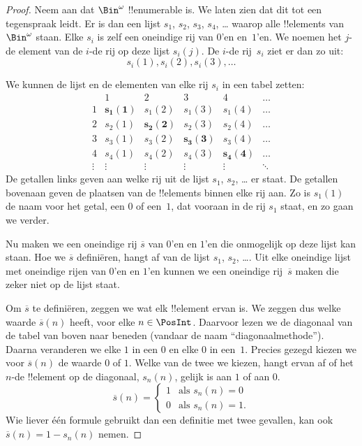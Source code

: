 \documentclass[openany]{memoir}
\begin{document}
\begin{proof}
Neem aan dat $\Bin^\omega$ !!{enumerable} is. We laten zien dat dit tot
een tegenspraak leidt. Er is dan een lijst $s_{1}$, $s_{2}$,
$s_{3}$, $s_{4}$, \dots{} waarop alle !!{element}s van~$\Bin^\omega$
staan. Elke $s_i$ is zelf een oneindige rij van $0$'en en~$1$'en. We
noemen het $j$-de element van de $i$-de rij op deze lijst $s_i(j)$. De
$i$-de rij~$s_i$ ziet er dan zo uit:
\[
s_i(1), s_i(2), s_i(3), \dots
\]

We kunnen de lijst en de elementen van elke rij $s_i$ in een tabel
zetten:
\[
\begin{array}{c|c|c|c|c|c}
& 1 & 2 & 3 & 4 & \dots \\\hline
1 & \mathbf{s_{1}(1)} & s_{1}(2) & s_{1}(3) & s_1(4) & \dots \\\hline
2 & s_{2}(1)& \mathbf{s_{2}(2)} & s_2(3) & s_2(4) & \dots \\\hline
3 & s_{3}(1)& s_{3}(2) & \mathbf{s_3(3)} & s_3(4) & \dots \\\hline
4 & s_{4}(1)& s_{4}(2) & s_4(3) & \mathbf{s_4(4)} & \dots \\\hline
\vdots & \vdots & \vdots & \vdots & \vdots & \mathbf{\ddots}
\end{array}
\]
De getallen links geven aan welke rij uit de lijst $s_1$, $s_2$,
\dots{} er staat. De getallen bovenaan geven de plaatsen van de
!!{element}s binnen elke rij aan. Zo is $s_{1}(1)$ de naam voor het
getal, een $0$ of een~$1$, dat vooraan in de rij $s_{1}$ staat, en zo
gaan we verder.

Nu maken we een oneindige rij $\overline{s}$ van $0$'en en $1$'en die
onmogelijk op deze lijst kan staan. Hoe we $\overline{s}$ definiëren,
hangt af van de lijst $s_1$, $s_2$, \dots. Uit elke oneindige lijst met
oneindige rijen van $0$'en en $1$'en kunnen we een oneindige
rij~$\overline{s}$ maken die zeker niet op de lijst staat.

Om $\overline{s}$ te definiëren, zeggen we wat elk !!{element} ervan
is. We zeggen dus welke waarde $\overline{s}(n)$ heeft, voor elke $n \in
\PosInt$. Daarvoor lezen
we de diagonaal van de tabel van boven naar beneden (vandaar de naam
``diagonaalmethode''). Daarna veranderen we elke $1$ in een $0$ en elke
$0$ in een~$1$. Precies gezegd kiezen we voor $\overline{s}(n)$ de
waarde $0$ of $1$. Welke van de twee we kiezen, hangt ervan af of het
$n$-de !!{element} op de diagonaal, $s_n(n)$, gelijk is aan $1$ of aan
$0$.
\[
\overline{s}(n) =
\begin{cases}
1 & \text{als $s_{n}(n) = 0$}\\
0 & \text{als $s_{n}(n) = 1$}.
\end{cases}
\]
Wie liever één formule gebruikt dan een definitie met twee gevallen,
kan ook $\overline{s}(n) = 1 - s_n(n)$ nemen.


\end{proof}
\end{document}
